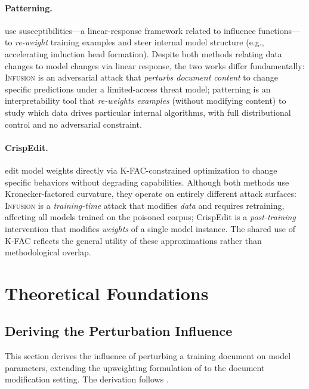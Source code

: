\documentclass{article} %
\begin{document}
\paragraph{Patterning.}
\citet{wang2026patterning} use susceptibilities---a linear-response framework related to influence functions---to \emph{re-weight} training examples and steer internal model structure (e.g., accelerating induction head formation). Despite both methods relating data changes to model changes via linear response, the two works differ fundamentally: \textsc{Infusion} is an adversarial attack that \emph{perturbs document content} to change specific predictions under a limited-access threat model; patterning is an interpretability tool that \emph{re-weights examples} (without modifying content) to study which data drives particular internal algorithms, with full distributional control and no adversarial constraint.

\paragraph{CrispEdit.}
\citet{ikram2026crispedit} edit model weights directly via K-FAC-constrained optimization to change specific behaviors without degrading capabilities. Although both methods use Kronecker-factored curvature, they operate on entirely different attack surfaces: \textsc{Infusion} is a \emph{training-time} attack that modifies \emph{data} and requires retraining, affecting all models trained on the poisoned corpus; CrispEdit is a \emph{post-training} intervention that modifies \emph{weights} of a single model instance. The shared use of K-FAC reflects the general utility of these approximations rather than methodological overlap.



\section{Theoretical Foundations}
\label{apndx_theory}

\subsection{Deriving the Perturbation Influence}
\label{apndx_perturbing}

This section derives the influence of perturbing a training document on model parameters, extending the upweighting formulation of \citet{cook1982residuals} to the document modification setting. The derivation follows \citet{koh2017understanding}.
\end{document}
